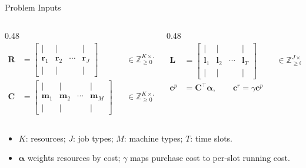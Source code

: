 \documentclass[aspectratio=169,10pt]{beamer}
\newcommand{\R}{\mathbf{R}}
\newcommand{\C}{\mathbf{C}}
\newcommand{\Lmat}{\mathbf{L}}
\newcommand{\cp}{\mathbf{c}^{p}}
\newcommand{\cr}{\mathbf{c}^{r}}
\begin{document}
\begin{frame}{Problem Inputs}
  \begin{columns}[T,totalwidth=\textwidth]
    \begin{column}{0.48\textwidth}
      \begin{align*}
        \R &= \begin{bmatrix}
          | & | & & |\\
          \mathbf{r}_1 & \mathbf{r}_2 & \cdots & \mathbf{r}_J\\
          | & | & & |
        \end{bmatrix}
        &&\in \mathbb{Z}_{\geq 0}^{K \times J}\\[0.3cm]
        \C &= \begin{bmatrix}
          | & | & & |\\
          \mathbf{m}_1 & \mathbf{m}_2 & \cdots & \mathbf{m}_M\\
          | & | & & |
        \end{bmatrix}
        &&\in \mathbb{Z}_{\geq 0}^{K \times M}
      \end{align*}
    \end{column}
    \begin{column}{0.48\textwidth}
      \begin{align*}
        \Lmat &= \begin{bmatrix}
          | & | & & |\\
          \mathbf{l}_1 & \mathbf{l}_2 & \cdots & \mathbf{l}_T\\
          | & | & & |
        \end{bmatrix}
        &&\in \mathbb{Z}_{\geq 0}^{J \times T}\\[0.3cm]
        \cp &= \C^\top \boldsymbol{\alpha}, \qquad
        \cr = \gamma \cp
      \end{align*}
    \end{column}
  \end{columns}
  \vspace{0.2cm}
  \begin{itemize}
    \item $K$: resources; $J$: job types; $M$: machine types; $T$: time slots.
    \item $\boldsymbol{\alpha}$ weights resources by cost; $\gamma$ maps purchase cost to per-slot running cost.
  \end{itemize}
\end{frame}
\end{document}
